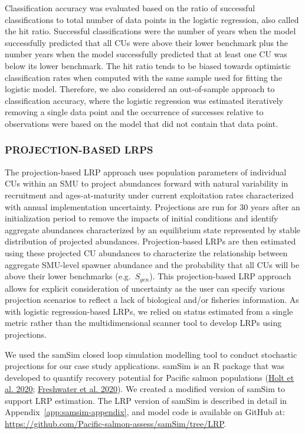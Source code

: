 \documentclass[11pt]{book}
\begin{document}
Classification accuracy was evaluated based on the ratio of successful classifications to total number of data points in the logistic regression, also called the hit ratio. Successful classifications were the number of years when the model successfully predicted that all CUs were above their lower benchmark plus the number years when the model successfully predicted that at least one CU was below its lower benchmark. The hit ratio tends to be biased towards optimistic classification rates when computed with the same sample used for fitting the logistic model. Therefore, we also considered an out-of-sample approach to classification accuracy, where the logistic regression was estimated iteratively removing a single data point and the occurrence of successes relative to observations were based on the model that did not contain that data point.

\hypertarget{projectedMethods}{%
\subsubsection{PROJECTION-BASED LRPS}\label{projectedMethods}}

The projection-based LRP approach uses population parameters of individual CUs within an SMU to project abundances forward with natural variability in recruitment and ages-at-maturity under current exploitation rates characterized with annual implementation uncertainty. Projections are run for 30 years after an initialization period to remove the impacts of initial conditions and identify aggregate abundances characterized by an equilibrium state represented by stable distribution of projected abundances. Projection-based LRPs are then estimated using these projected CU abundances to characterize the relationship between aggregate SMU-level spawner abundance and the probability that all CUs will be above their lower benchmarks (e.g.~\(S_{gen}\)). This projection-based LRP approach allows for explicit consideration of uncertainty as the user can specify various projection scenarios to reflect a lack of biological and/or fisheries information. As with logistic regression-based LRPs, we relied on status estimated from a single metric rather than the multidimensional scanner tool to develop LRPs using projections.

We used the samSim closed loop simulation modelling tool to conduct stochastic projections for our case study applications. samSim is an R package that was developed to quantify recovery potential for Pacific salmon populations (\protect\hyperlink{ref-holtQuantitativeToolEvaluating2020}{Holt et al. 2020}; \protect\hyperlink{ref-freshwaterBenefitsLimitationsIncreasing2020}{Freshwater et al. 2020}). We created a modified version of samSim to support LRP estimation. The LRP version of samSim is described in detail in Appendix~\ref{app:samsim-appendix}, and model code is available on GitHub at: \url{https://github.com/Pacific-salmon-assess/samSim/tree/LRP}.
\end{document}
